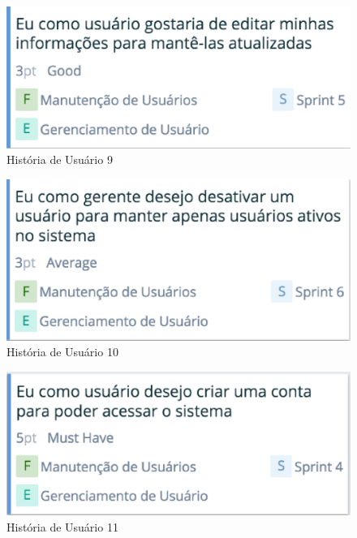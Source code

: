 \begin{figure}[H]
    \centering
	\includegraphics[keepaspectratio=true,scale=0.5]{figuras/time9.eps}
    \caption{História de Usuário 9}
    \label{fig:roadmap}
\end{figure}

\begin{figure}[H]
    \centering
	\includegraphics[keepaspectratio=true,scale=0.5]{figuras/time10.eps}
    \caption{História de Usuário 10}
    \label{fig:roadmap}
\end{figure}

\begin{figure}[H]
    \centering
	\includegraphics[keepaspectratio=true,scale=0.5]{figuras/time11.eps}
    \caption{História de Usuário 11}
    \label{fig:roadmap}
\end{figure}

